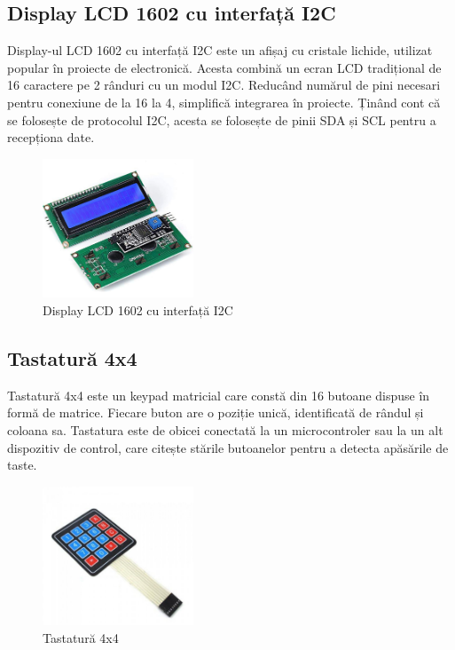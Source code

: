 \subsection{Display LCD 1602 cu interfață I2C}
Display-ul LCD 1602 cu interfață I2C este un afișaj cu cristale lichide, utilizat popular în proiecte de electronică. Acesta combină un ecran LCD tradițional de 16 caractere pe 2 rânduri cu un modul I2C. Reducând numărul de pini necesari pentru conexiune de la 16 la 4, simplifică integrarea în proiecte. Ținând cont că se folosește de protocolul I2C, acesta se folosește de pinii SDA și SCL pentru a recepționa date.

\begin{figure}[H]
\includegraphics[width=0.4\textwidth, height=0.4\textwidth]{images/lcd.png}
\caption{Display LCD 1602 cu interfață I2C \cite{lcd_poza}}
\label{fig:lcd}
\end{figure}

\subsection{Tastatură 4x4}
Tastatură 4x4 este un keypad matricial care constă din 16 butoane dispuse în formă de matrice. Fiecare buton are o poziție unică, identificată de rândul și coloana sa. Tastatura este de obicei conectată la un microcontroler sau la un alt dispozitiv de control, care citește stările butoanelor pentru a detecta apăsările de taste.

\begin{figure}[H]
\includegraphics[width=0.4\textwidth, height=0.4\textwidth]{images/tastatura.png}
\caption{Tastatură 4x4 \cite{key_poza}}
\label{fig:tastatura}
\end{figure}


